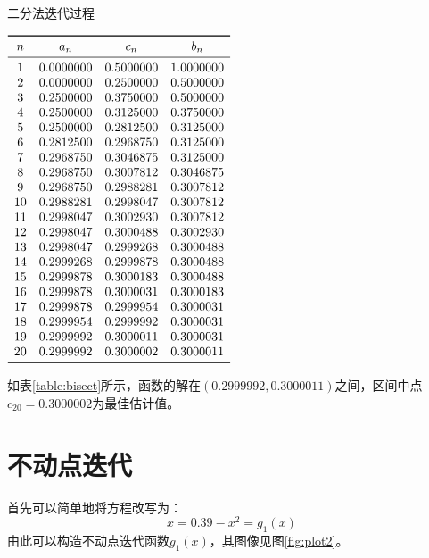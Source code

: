 \documentclass{ctexart}
\begin{document}
\begin{table}[htpb]
\centering
\caption{二分法迭代过程}
$\begin{array}{cccc}
    \toprule
    n & a_n & c_n & b_n \\
    \midrule
     1 & 0.0000000 & 0.5000000 & 1.0000000 \\
     2 & 0.0000000 & 0.2500000 & 0.5000000 \\
     3 & 0.2500000 & 0.3750000 & 0.5000000 \\
     4 & 0.2500000 & 0.3125000 & 0.3750000 \\
     5 & 0.2500000 & 0.2812500 & 0.3125000 \\
     6 & 0.2812500 & 0.2968750 & 0.3125000 \\
     7 & 0.2968750 & 0.3046875 & 0.3125000 \\
     8 & 0.2968750 & 0.3007812 & 0.3046875 \\
     9 & 0.2968750 & 0.2988281 & 0.3007812 \\
    10 & 0.2988281 & 0.2998047 & 0.3007812 \\
    11 & 0.2998047 & 0.3002930 & 0.3007812 \\
    12 & 0.2998047 & 0.3000488 & 0.3002930 \\
    13 & 0.2998047 & 0.2999268 & 0.3000488 \\
    14 & 0.2999268 & 0.2999878 & 0.3000488 \\
    15 & 0.2999878 & 0.3000183 & 0.3000488 \\
    16 & 0.2999878 & 0.3000031 & 0.3000183 \\
    17 & 0.2999878 & 0.2999954 & 0.3000031 \\
    18 & 0.2999954 & 0.2999992 & 0.3000031 \\
    19 & 0.2999992 & 0.3000011 & 0.3000031 \\
    20 & 0.2999992 & 0.3000002 & 0.3000011 \\
    \bottomrule
\end{array}\label{table:bisect}$
\end{table}

如表\ref{table:bisect}所示，函数的解在$(0.2999992,0.3000011)$之间，区间中点$c_{20}=0.3000002$为最佳估计值。

\section{不动点迭代}

首先可以简单地将方程改写为：
\[
x = 0.39 - x^2 = g_1(x)
\]
由此可以构造不动点迭代函数$g_1(x)$，其图像见图\ref{fig:plot2}。
\end{document}
